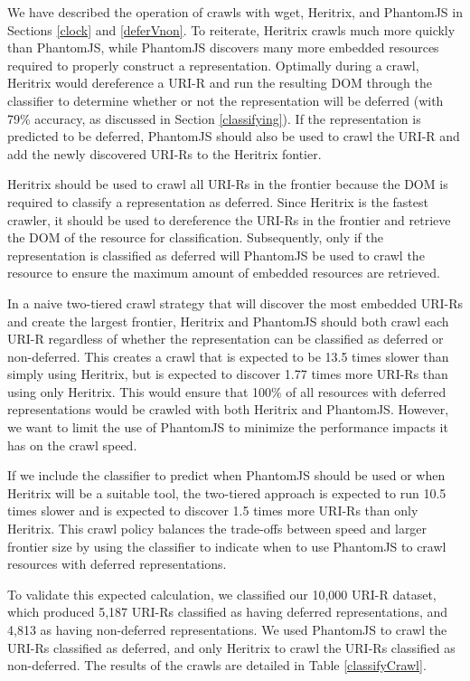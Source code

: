 \documentclass{ipres_proc_article-sp}
\begin{document}
We have described the operation of crawls with wget, Heritrix, and PhantomJS in Sections \ref{clock} and \ref{deferVnon}. To reiterate, Heritrix crawls much more quickly than PhantomJS, while PhantomJS discovers many more embedded resources required to properly construct a representation. Optimally during a crawl, Heritrix would dereference a URI-R and run the resulting DOM through the classifier to determine whether or not the representation will be deferred (with 79\% accuracy, as discussed in Section \ref{classifying}). If the representation is predicted to be deferred, PhantomJS should also be used to crawl the URI-R and add the newly discovered URI-Rs to the Heritrix fontier. 

Heritrix should be used to crawl all URI-Rs in the frontier because the DOM is required to classify a representation as deferred. Since Heritrix is the fastest crawler, it should be used to dereference the URI-Rs in the frontier and retrieve the DOM of the resource for classification. Subsequently, only if the representation is classified as deferred will PhantomJS be used to crawl the resource to ensure the maximum amount of embedded resources are retrieved.

In a naive two-tiered crawl strategy that will discover the most embedded URI-Rs and create the largest frontier, Heritrix and PhantomJS should both crawl each URI-R regardless of whether the representation can be classified as deferred or non-deferred. This creates a crawl that is expected to be 13.5 times slower than simply using Heritrix, but is expected to discover 1.77 times more URI-Rs than using only Heritrix. This would ensure that 100\% of all resources with deferred representations would be crawled with both Heritrix and PhantomJS. However, we want to limit the use of PhantomJS to minimize the performance impacts it has on the crawl speed.

If we include the classifier to predict when PhantomJS should be used or when Heritrix will be a suitable tool, the two-tiered approach is expected to run 10.5 times slower and is expected to discover 1.5 times more URI-Rs than only Heritrix. This crawl policy balances the trade-offs between speed and larger frontier size by using the classifier to indicate when to use PhantomJS to crawl resources with deferred representations.

To validate this expected calculation, we classified our 10,000 URI-R dataset, which produced 5,187 URI-Rs classified as having deferred representations, and 4,813 as having non-deferred representations. We used PhantomJS to crawl the URI-Rs classified as deferred, and only Heritrix to crawl the URI-Rs classified as non-deferred. The results of the crawls are detailed in Table \ref{classifyCrawl}.
\end{document}

